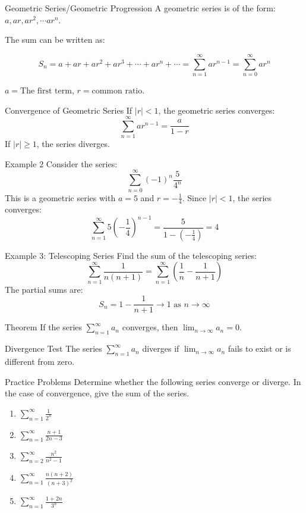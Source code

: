 \documentclass[aspectratio=169,xcolor=dvipsnames,svgnames,x11names,fleqn]{beamer}
\begin{document}
\begin{frame}{Geometric Series/Geometric Progression}
A geometric series is of the form: $a, ar, ar^2, \cdots ar^n$.

The sum can be written as:


$$S_n = a + ar + ar^2 + ar^3 + \cdots + ar^n + \cdots = \sum_{n=1}^{\infty} ar^{n-1} = \sum_{n=0}^{\infty} ar^n$$

$
a = \text{The first term}
$, $ r = \text{common ratio}$.


\end{frame}

\begin{frame}{Convergence of Geometric Series}
If $|r| < 1$, the geometric series converges:
$$\sum_{n=1}^{\infty} ar^{n-1} = \frac{a}{1 - r}$$
If $|r| \geq 1$, the series diverges.
\end{frame}

\begin{frame}{Example 2}
Consider the series:
$$\sum_{n=0}^{\infty} (-1)^n \frac{5}{4^n}$$
This is a geometric series with $a = 5$ and $r = -\frac{1}{4}$. Since $|r| < 1$, the series converges:
$$\sum_{n=1}^{\infty} 5 \left(-\frac{1}{4}\right)^{n-1} = \frac{5}{1 - \left(-\frac{1}{4}\right)} = 4$$
\end{frame}

\begin{frame}{Example 3: Telescoping Series}
Find the sum of the telescoping series:
$$\sum_{n=1}^{\infty} \frac{1}{n(n+1)} = \sum_{n=1}^{\infty} \left(\frac{1}{n} - \frac{1}{n+1}\right)$$
The partial sums are:
$$S_n = 1 - \frac{1}{n+1} \to 1 \text{ as } n \to \infty$$
\end{frame}

\begin{frame}{Theorem}
If the series $\sum_{n=1}^{\infty} a_n$ converges, then $\lim_{n \to \infty} a_n = 0$.
\end{frame}

\begin{frame}{Divergence Test}
The series $\sum_{n=1}^{\infty} a_n$ diverges if $\lim_{n \to \infty} a_n$ fails to exist or is different from zero.
\end{frame}

\begin{frame}{Practice Problems}
Determine whether the following series converge or diverge. In the case of convergence, give the sum of the series.
\begin{enumerate}
    \item $\sum_{n=1}^{\infty} \frac{1}{2^n}$
    \item $\sum_{n=1}^{\infty} \frac{n+1}{2n-3}$
    \item $\sum_{n=2}^{\infty} \frac{n^2}{n^2-1}$
    \item $\sum_{n=1}^{\infty} \frac{n(n+2)}{(n+3)^2}$
    \item $\sum_{n=1}^{\infty} \frac{1+2n}{3^n}$
\end{enumerate}
\end{frame}
\end{document}
